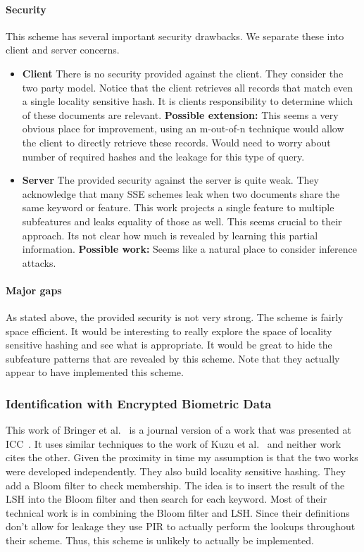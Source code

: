 \paragraph{Security}  This scheme has several important security drawbacks.  We separate these into client and server concerns.

\begin{itemize}
\item \textbf{Client} There is no security provided against the client.  They consider the two party model.  Notice that the client retrieves all records that match even a single locality sensitive hash.  It is clients responsibility to determine which of these documents are relevant.  \textbf{Possible extension:} This seems a very obvious place for improvement, using an m-out-of-n technique would allow the client to directly retrieve these records.  Would need to worry about number of required hashes and the leakage for this type of query.
\item \textbf{Server} The provided security against the server is quite weak.  They acknowledge that many SSE schemes leak when two documents share the same keyword or feature.  This work projects a single feature to multiple subfeatures and leaks equality of those as well.  This seems crucial to their approach.  Its not clear how much is revealed by learning this partial information.  \textbf{Possible work:} Seems like a natural place to consider inference attacks.
\end{itemize}

\paragraph{Major gaps} As stated above, the provided security is not very strong.  The scheme is fairly space efficient.  It would be interesting to really explore the space of locality sensitive hashing and see what is appropriate.  It would be great to hide the subfeature patterns that are revealed by this scheme.  Note that they actually appear to have implemented this scheme.

\subsubsection{Identification with Encrypted Biometric Data}
This work of Bringer et al.~\cite{bringer2011identification} is a journal version of a work that was presented at ICC~\cite{bringer2009error}.  It uses similar techniques to the work of Kuzu et al.~\cite{kuzu2012efficient} and neither work cites the other.  Given the proximity in time my assumption is that the two works were developed independently.  They also build locality sensitive hashing.  They add a Bloom filter to check membership.  The idea is to insert the result of the LSH into the Bloom filter and then search for each keyword.  Most of their technical work is in combining the Bloom filter and LSH.  Since their definitions don't allow for leakage they use PIR to actually perform the lookups throughout their scheme.  Thus, this scheme is unlikely to actually be implemented.


